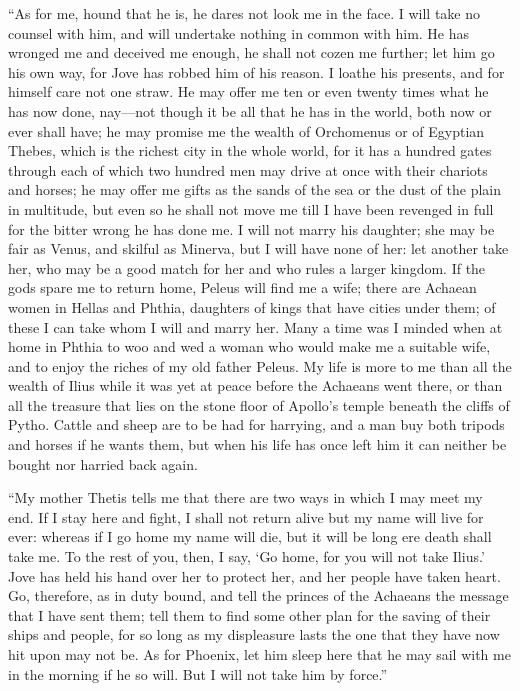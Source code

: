 “As for me, hound that he is, he dares not look me in the face. I will
take no counsel with him, and will undertake nothing in common with him.
He has wronged me and deceived me enough, he shall not cozen me further;
let him go his own way, for Jove has robbed him of his reason. I loathe
his presents, and for himself care not one straw. He may offer me ten or
even twenty times what he has now done, nay—not though it be all
that he has in the world, both now or ever shall have; he may promise me
the wealth of Orchomenus or of Egyptian Thebes, which is the richest city
in the whole world, for it has a hundred gates through each of which two
hundred men may drive at once with their chariots and horses; he may offer
me gifts as the sands of the sea or the dust of the plain in multitude,
but even so he shall not move me till I have been revenged in full for the
bitter wrong he has done me. I will not marry his daughter; she may be
fair as Venus, and skilful as Minerva, but I will have none of her: let
another take her, who may be a good match for her and who rules a larger
kingdom. If the gods spare me to return home, Peleus will find me a wife;
there are Achaean women in Hellas and Phthia, daughters of kings that have
cities under them; of these I can take whom I will and marry her. Many a
time was I minded when at home in Phthia to woo and wed a woman who would
make me a suitable wife, and to enjoy the riches of my old father Peleus.
My life is more to me than all the wealth of Ilius while it was yet at
peace before the Achaeans went there, or than all the treasure that lies
on the stone floor of Apollo’s temple beneath the cliffs of Pytho. Cattle
and sheep are to be had for harrying, and a man buy both tripods and
horses if he wants them, but when his life has once left him it can
neither be bought nor harried back again.

“My mother Thetis tells me that there are two ways in which I may meet my
end. If I stay here and fight, I shall not return alive but my name will
live for ever: whereas if I go home my name will die, but it will be long
ere death shall take me. To the rest of you, then, I say, ‘Go home, for
you will not take Ilius.’ Jove has held his hand over her to protect her,
and her people have taken heart. Go, therefore, as in duty bound, and tell
the princes of the Achaeans the message that I have sent them; tell them
to find some other plan for the saving of their ships and people, for so
long as my displeasure lasts the one that they have now hit upon may not
be. As for Phoenix, let him sleep here that he may sail with me in the
morning if he so will. But I will not take him by force.”

